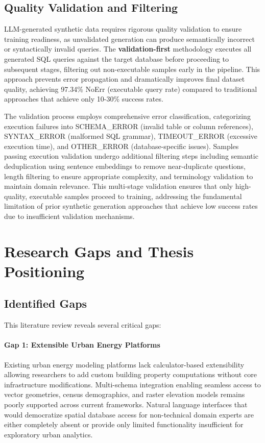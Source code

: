 \subsection{Quality Validation and Filtering}

LLM-generated synthetic data requires rigorous quality validation to ensure training readiness, as unvalidated generation can produce semantically incorrect or syntactically invalid queries. The \textbf{validation-first} methodology executes all generated SQL queries against the target database before proceeding to subsequent stages, filtering out non-executable samples early in the pipeline. This approach prevents error propagation and dramatically improves final dataset quality, achieving 97.34\% NoErr (executable query rate) compared to traditional approaches that achieve only 10-30\% success rates.

The validation process employs comprehensive error classification, categorizing execution failures into SCHEMA\_ERROR (invalid table or column references), SYNTAX\_ERROR (malformed SQL grammar), TIMEOUT\_ERROR (excessive execution time), and OTHER\_ERROR (database-specific issues). Samples passing execution validation undergo additional filtering steps including semantic deduplication using sentence embeddings to remove near-duplicate questions, length filtering to ensure appropriate complexity, and terminology validation to maintain domain relevance. This multi-stage validation ensures that only high-quality, executable samples proceed to training, addressing the fundamental limitation of prior synthetic generation approaches that achieve low success rates due to insufficient validation mechanisms.


\section{Research Gaps and Thesis Positioning}

\subsection{Identified Gaps}

This literature review reveals several critical gaps:

\paragraph{Gap 1: Extensible Urban Energy Platforms}

Existing urban energy modeling platforms lack calculator-based extensibility allowing researchers to add custom building property computations without core infrastructure modifications. Multi-schema integration enabling seamless access to vector geometries, census demographics, and raster elevation models remains poorly supported across current frameworks. Natural language interfaces that would democratize spatial database access for non-technical domain experts are either completely absent or provide only limited functionality insufficient for exploratory urban analytics.

